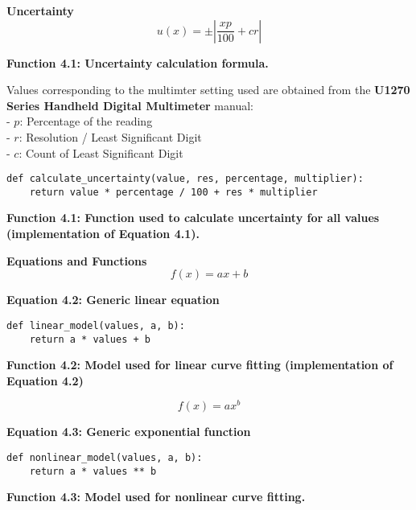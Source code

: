 \documentclass[
	letterpaper, %
	10pt, %
]{CSUniSchoolLabReport}
\begin{document}
\newpage

{\large\textbf{Uncertainty}}
{\vspace{10pt}}\\
$$ u(x) = \pm\left|\frac{xp}{100} + c r\right|$$
\begin{center}
    \textbf{Function 4.1: Uncertainty calculation formula.}\\
\end{center}
Values corresponding to the multimter setting used are obtained from the \textbf{U1270 Series Handheld Digital Multimeter} manual:\\
- $p$: Percentage of the reading\\
- $r$: Resolution / Least Significant Digit\\
- $c$: Count of Least Significant Digit\\
\vspace{10pt}
\begin{verbatim}
def calculate_uncertainty(value, res, percentage, multiplier):
    return value * percentage / 100 + res * multiplier
\end{verbatim}
\begin{center}
    \textbf{Function 4.1: Function used to calculate uncertainty for all values (implementation of Equation 4.1).}\\
\end{center}
{\vspace{10pt}}
{\large\textbf{Equations and Functions}}
$$f(x) = ax + b$$
\begin{center}
	\textbf{Equation 4.2: Generic linear equation}
\end{center}
\begin{verbatim}
def linear_model(values, a, b):
    return a * values + b
\end{verbatim}
\begin{center}
    \textbf{Function 4.2: Model used for linear curve fitting (implementation of Equation 4.2)}\\
\end{center}

$$f(x) = ax^b$$
\begin{center}
	\textbf{Equation 4.3: Generic exponential function}
\end{center}
\begin{verbatim}
def nonlinear_model(values, a, b):
    return a * values ** b
\end{verbatim}
\begin{center}
    \textbf{Function 4.3: Model used for nonlinear curve fitting.}\\
\end{center}
\end{document}
